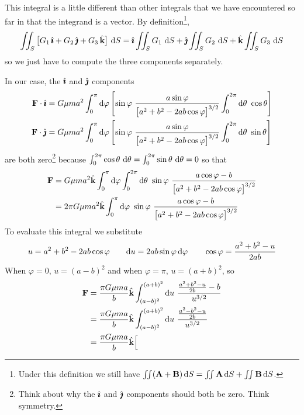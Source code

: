 \begin{eg}
This integral is a little different than other integrals that we have 
encountered so far in that the integrand is a vector. By 
definition\footnote{Under this definition we still have 
$\iint (\mathbf{A}+\mathbf{B})\,\mathrm{d}S = \iint \mathbf{A}\,\mathrm{d}S + \iint\mathbf{B}\,\mathrm{d}S$.
},
\begin{equation*}
\iint_S \big[G_1\,\hat{\pmb{\imath}} + G_2\,\hat{\pmb{\jmath}} + G_3\,\hat{\mathbf{k}} \big]\ \mathrm{d}S
=\hat{\pmb{\imath}} \iint_S G_1\ \mathrm{d}S
+\hat{\pmb{\jmath}} \iint_S G_2\ \mathrm{d}S
+\hat{\mathbf{k}} \iint_S G_3\ \mathrm{d}S
\end{equation*}
so we just have to compute the three components separately. 

In our case,
the $\hat{\pmb{\imath}}$ and $\hat{\pmb{\jmath}}$ components 
\begin{align*}
\vF\cdot\hi & = G\mu m a^2 \int_0^\pi\dee{\varphi} \left[
\sin\varphi\ 
    \frac{a\sin\varphi}
         {\big[a^2+b^2 -2ab\cos\varphi\big]^{3/2}}
\int_0^{2\pi}\dee{\theta}\ \cos\theta
\right] \\
\vF\cdot\hj & = G\mu m a^2\int_0^\pi\dee{\varphi}\left[
 \sin\varphi\ 
    \frac{a\sin\varphi}
         {\big[a^2+b^2 -2ab\cos\varphi\big]^{3/2}}
\int_0^{2\pi}\dee{\theta}\ \sin\theta
\right]
\end{align*}
are both zero\footnote{Think about why the $\hat{\pmb{\imath}}$ and $\hat{\pmb{\jmath}}$ components
should both be zero. Think symmetry.} because
$\int_0^{2\pi}\cos\theta\ \mathrm{d}\theta
           =\int_0^{2\pi}\sin\theta\ \mathrm{d}\theta
           =0$
so that
\begin{align*}
\vF 
&=  G\mu m a^2 \hk\int_0^\pi\dee{\varphi} \int_0^{2\pi}\dee{\theta}\ \sin\varphi\ 
    \frac{a\cos\varphi-b}
         {\big[a^2+b^2 -2ab\cos\varphi\big]^{3/2}} \\
&=  2\pi G\mu m a^2 \hk\int_0^\pi\dee{\varphi}\ \sin\varphi\ 
    \frac{a\cos\varphi-b}
         {\big[a^2+b^2 -2ab\cos\varphi\big]^{3/2}}
\end{align*}
To evaluate this integral we substitute
\begin{align*}
u=a^2+b^2 -2ab\cos\varphi\qquad
\mathrm{d}u = 2ab\sin\varphi\,\mathrm{d}\varphi\qquad
\cos\varphi = \frac{a^2+b^2-u}{2ab}
\end{align*}
When $\varphi=0$, $u=(a-b)^2$ and when $\varphi =\pi$, $u=(a+b)^2$, so
\begin{align*}
\vF 
&=  \frac{\pi G\mu m a}{b} \hk\int_{(a-b)^2}^{(a+b)^2} 
     \dee{u}\  \frac{\frac{a^2+b^2-u}{2b}-b}  {u^{3/2}} \\
&=  \frac{\pi G\mu m a}{b} \hk\int_{(a-b)^2}^{(a+b)^2} 
     \dee{u}\  \frac{\frac{a^2-b^2-u}{2b}}  {u^{3/2}} \\
&=  \frac{\pi G\mu m a}{b} \hk\Big[ 

\end{align*}
\end{eg}
